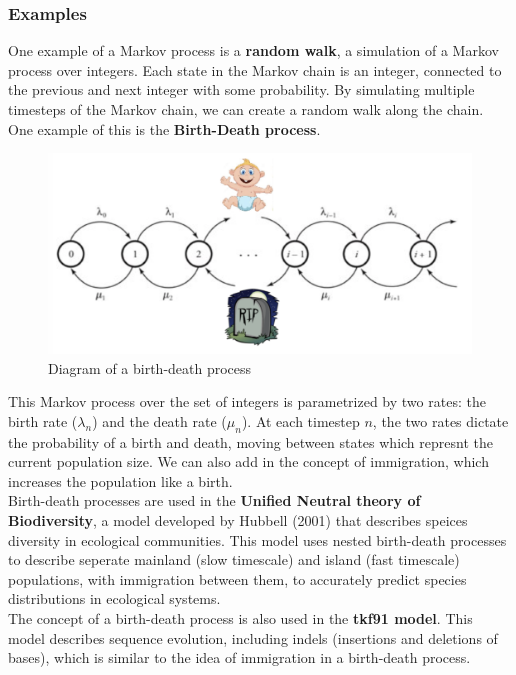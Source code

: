 \documentclass[12pt]{article}
\begin{document}
\subsubsection{Examples}
One example of a Markov process is a \textbf{random walk}, a simulation of a Markov process over integers. Each state in the Markov chain is an integer, connected to the previous and next integer with some probability. By simulating multiple timesteps of the Markov chain, we can create a random walk along the chain.\\[10pt]
One example of this is the \textbf{Birth-Death process}.
\begin{figure}[h]
    \centering
    \includegraphics[width = .7\linewidth]{bd_proc.png}
    \caption{Diagram of a birth-death process}
    \label{fig:bd}
\end{figure}
This Markov process over the set of integers is parametrized by two rates: the birth rate ($\lambda_n$) and the death rate ($\mu_n$). At each timestep $n$, the two rates dictate the probability of a birth and death, moving between states which represnt the current population size. We can also add in the concept of immigration, which increases the population like a birth.\\[10pt]
Birth-death processes are used in the \textbf{Unified Neutral theory of Biodiversity}, a model developed by Hubbell (2001) that describes speices diversity in ecological communities. This model uses nested birth-death processes to describe seperate mainland (slow timescale) and island (fast timescale) populations, with immigration between them, to accurately predict species distributions in ecological systems.\\[10pt]
The concept of a birth-death process is also used in the \textbf{tkf91 model}. This model describes sequence evolution, including indels (insertions and deletions of bases), which is similar to the idea of immigration in a birth-death process.
\end{document}
